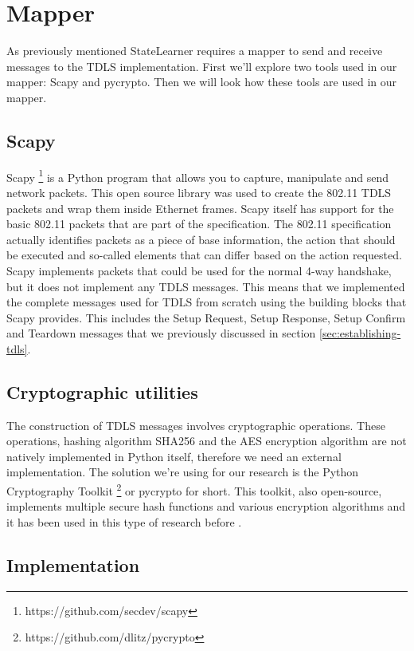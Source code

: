 \section{Mapper}

As previously mentioned StateLearner requires a mapper to send and receive messages to the TDLS implementation. First we'll explore two tools used in our mapper: Scapy and pycrypto. Then we will look how these tools are used in our mapper.

\subsection{Scapy}

Scapy \footnote{https://github.com/secdev/scapy} is a Python program that allows you to capture, manipulate and send network packets. This open source library was used to create the 802.11 TDLS packets and wrap them inside Ethernet frames. Scapy itself has support for the basic 802.11 packets that are part of the specification. The 802.11 specification actually identifies packets as a piece of base information, the action that should be executed and so-called elements that can differ based on the action requested. Scapy implements packets that could be used for the normal 4-way handshake, but it does not implement any TDLS messages.
This means that we implemented the complete messages used for TDLS from scratch using the building blocks that Scapy provides. This includes the Setup Request, Setup Response, Setup Confirm and Teardown messages that we previously discussed in section \ref{sec:establishing-tdls}.

\subsection{Cryptographic utilities}

The construction of TDLS messages involves cryptographic operations. These operations, hashing algorithm SHA256 and the AES encryption algorithm are not natively implemented in Python itself, therefore we need an external implementation. The solution we're using for our research is the Python Cryptography Toolkit \footnote{https://github.com/dlitz/pycrypto} or pycrypto for short. This toolkit, also open-source, implements multiple secure hash functions and various encryption algorithms and it has been used in this type of research before \cite{Vanhoef:2017,Veldhuizen:2017}.

\subsection{Implementation}
\label{research:mapper:implementation}

